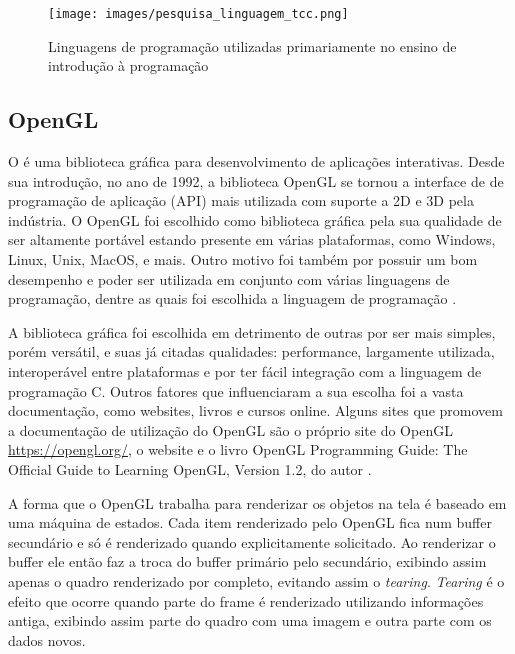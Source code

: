 \documentclass[12pt, %
openright,
oneside, %
a4paper,    %
brazil]{facom-ufu-abntex2}
\begin{document}
\pagebreak
\begin{figure}[htbp]
  \centering
  \texttt{[image: images/pesquisa\_linguagem\_tcc.png]}
  \caption{Linguagens de programação utilizadas primariamente no ensino de introdução à programação}
  \label{fig:pesquisa_linguagem_tcc}
\end{figure}

\subsection{OpenGL}
O  é uma biblioteca gráfica para desenvolvimento de aplicações interativas. Desde sua introdução, no ano de 1992, a biblioteca OpenGL se tornou  a interface de de programação de aplicação (API) mais utilizada com suporte a 2D e 3D pela indústria. O OpenGL foi escolhido como biblioteca gráfica pela sua qualidade de ser altamente portável estando presente em várias plataformas, como Windows, Linux, Unix, MacOS, e mais. Outro motivo foi também por possuir um bom desempenho e poder ser utilizada em conjunto com várias linguagens de programação, dentre as quais foi escolhida a linguagem de programação .

A biblioteca gráfica  foi escolhida em detrimento de outras por ser mais simples, porém versátil, e suas já citadas qualidades: performance, largamente utilizada, interoperável entre plataformas e por ter fácil integração com a linguagem de programação C. Outros fatores que influenciaram a sua escolha foi a vasta documentação, como websites, livros e cursos online. Alguns sites que promovem a documentação de utilização do OpenGL são o próprio site do OpenGL \hyperref[https://opengl.org/]{https://opengl.org/}, o website  e o livro OpenGL Programming Guide: The Official Guide to Learning OpenGL, Version 1.2, do autor .

A forma que o OpenGL trabalha para renderizar os objetos na tela é baseado em uma máquina de estados. Cada item renderizado pelo OpenGL fica num buffer secundário e só é renderizado quando explicitamente solicitado. Ao renderizar o buffer ele então faz a troca do buffer primário pelo secundário, exibindo assim apenas o quadro renderizado por completo, evitando assim o \textit{tearing}. \textit{Tearing} é o efeito que ocorre quando parte do frame é renderizado utilizando informações antiga, exibindo assim parte do quadro com uma imagem e outra parte com os dados novos.
\end{document}
